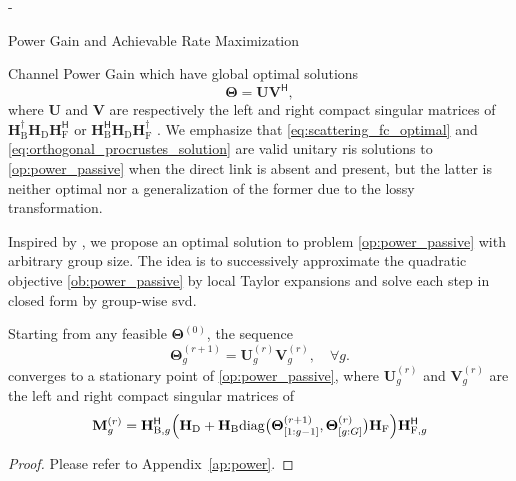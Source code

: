 \begin{section}{-}
\begin{subsection}{Power Gain and Achievable Rate Maximization}
\begin{subsubsection}{Channel Power Gain}
			which have global optimal solutions
			\begin{equation}
				\mathbf{\Theta} = \mathbf{U} \mathbf{V}^\mathsf{H},
				\label{eq:orthogonal_procrustes_solution}
			\end{equation}
			where $\mathbf{U}$ and $\mathbf{V}$ are respectively the left and right compact singular matrices of $\mathbf{H}_\mathrm{B}^\dagger \mathbf{H}_\mathrm{D} \mathbf{H}_\mathrm{F}^\mathsf{H}$ or $\mathbf{H}_\mathrm{B}^\mathsf{H} \mathbf{H}_\mathrm{D} \mathbf{H}_\mathrm{F}^\dagger$ \cite{Golub2013}.
			We emphasize that \eqref{eq:scattering_fc_optimal} and \eqref{eq:orthogonal_procrustes_solution} are valid unitary \gls{ris} solutions to \eqref{op:power_passive} when the direct link is absent and present, but the latter is neither optimal nor a generalization of the former due to the lossy transformation.

			Inspired by \cite{Nie2017}, we propose an optimal solution to problem \eqref{op:power_passive} with arbitrary group size.
			The idea is to successively approximate the quadratic objective \eqref{ob:power_passive} by local Taylor expansions and solve each step in closed form by group-wise \gls{svd}.

			\begin{proposition}\label{pp:power}
				Starting from any feasible $\mathbf{\Theta}^{(0)}$, the sequence
				\begin{equation}
					\mathbf{\Theta}_g^{(r+1)} = \mathbf{U}_g^{(r)} \mathbf{V}_g^{(r)}, \quad \forall g.
					\label{eq:scattering_power}
				\end{equation}
				converges to a stationary point of \eqref{op:power_passive}, where $\mathbf{U}_g^{(r)}$ and $\mathbf{V}_g^{(r)}$ are the left and right compact singular matrices of
				\begin{equation}
					\mathbf{M}_g^{(r)} = \mathbf{H}_{\mathrm{B},g}^\mathsf{H} \Bigl(\mathbf{H}_\mathrm{D} + \mathbf{H}_\mathrm{B} \mathrm{diag}\bigl(\mathbf{\Theta}_{[1:g-1]}^{(r+1)},\mathbf{\Theta}_{[g:G]}^{(r)}\bigr) \mathbf{H}_\mathrm{F}\Bigr) \mathbf{H}_{\mathrm{F},g}^\mathsf{H}
					\label{eq:auxiliary_matrix_power}
				\end{equation}
			\end{proposition}

			\begin{proof}
				Please refer to Appendix~\ref{ap:power}.
			\end{proof}


\end{subsubsection}
\end{subsection}
\end{section}
